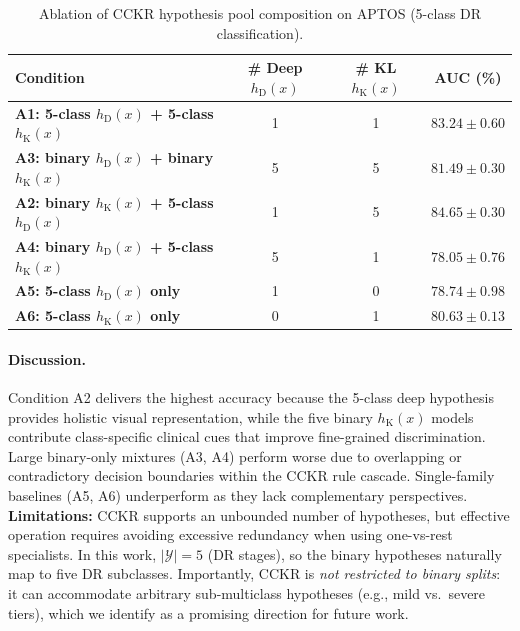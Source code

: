 \documentclass{article}
\begin{document}
\begin{table}[h]
\centering
\scriptsize
\setlength{\tabcolsep}{1pt}
\caption{Ablation of CCKR hypothesis pool composition on APTOS (5-class DR classification).}
\begin{tabular}{lccc}
\toprule
\textbf{Condition} &
\textbf{\# Deep $h_{\mathrm{D}}(x)$} &
\textbf{\# KL $h_{\mathrm{K}}(x)$} &
\textbf{AUC (\%)} \\
\midrule

\textbf{A1: 5-class $h_{\mathrm{D}}(x)$ + 5-class $h_{\mathrm{K}}(x)$} &
1 & 1 &
$83.24 \pm 0.60$ \\

\textbf{A3: binary $h_{\mathrm{D}}(x)$ + binary $h_{\mathrm{K}}(x)$} &
5 & 5 &
$81.49 \pm 0.30$ \\

\textbf{A2: binary $h_{\mathrm{K}}(x)$ + 5-class $h_{\mathrm{D}}(x)$} &
1 & 5 &
$\mathbf{84.65 \pm 0.30}$ \\

\textbf{A4: binary $h_{\mathrm{D}}(x)$ + 5-class $h_{\mathrm{K}}(x)$} &
5 & 1 &
$78.05 \pm 0.76$ \\

\textbf{A5: 5-class $h_{\mathrm{D}}(x)$ only} &
1 & 0 &
$78.74 \pm 0.98$ \\

\textbf{A6: 5-class $h_{\mathrm{K}}(x)$ only} &
0 & 1 &
$80.63 \pm 0.13$ \\

\bottomrule
\end{tabular}

\label{tab:aptos_CCKR_ablation}
\end{table}
\vspace{-10pt}
\paragraph{Discussion.}
Condition A2 delivers the highest accuracy because the 5-class deep hypothesis provides holistic visual representation, while the five binary $h_{\mathrm{K}}(x)$ models contribute class-specific clinical cues that improve fine-grained discrimination.
Large binary-only mixtures (A3, A4) perform worse due to overlapping or contradictory decision boundaries within the CCKR rule cascade.
Single-family baselines (A5, A6) underperform as they lack complementary perspectives. \textbf{Limitations: }CCKR supports an unbounded number of hypotheses, but effective operation requires avoiding excessive redundancy when using one-vs-rest specialists.
In this work, $|\mathcal{Y}| = 5$ (DR stages), so the binary hypotheses naturally map to five DR subclasses.
Importantly, CCKR is \textit{not restricted to binary splits}: it can accommodate arbitrary sub-multiclass hypotheses (e.g., mild vs.\ severe tiers), which we identify as a promising direction for future work.
\end{document}

